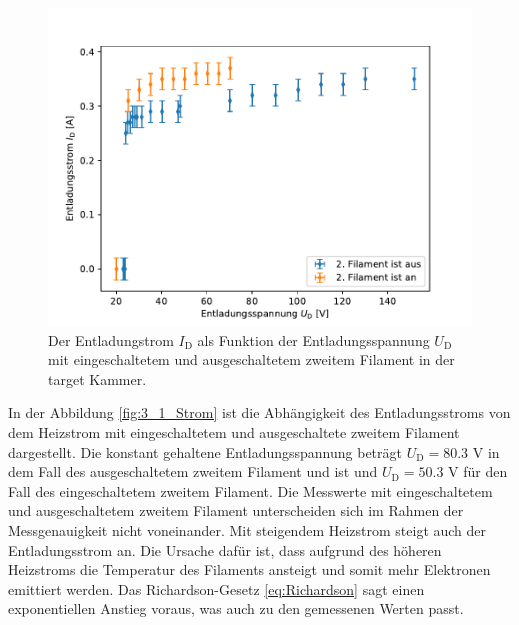 \begin{figure}[H]
\centering
\includegraphics[scale=0.6]{3_1_Spannung.pdf}
\caption{Der Entladungstrom $I_{\mathrm{D}}$ als Funktion der Entladungsspannung $U_{\mathrm{D}}$   mit eingeschaltetem und ausgeschaltetem zweitem Filament in der target Kammer.}
\label{fig:3_1_Spannung}
\end{figure}
In der Abbildung \ref{fig:3_1_Strom} ist die Abhängigkeit des Entladungsstroms von dem Heizstrom mit eingeschaltetem und ausgeschaltete zweitem Filament dargestellt. Die konstant gehaltene Entladungsspannung beträgt $U_{\mathrm{D}}=80.3$ V in dem Fall des ausgeschaltetem zweitem Filament und  ist und $U_{\mathrm{D}}=50.3$ V für den Fall des eingeschaltetem zweitem Filament. Die Messwerte mit eingeschaltetem und ausgeschaltetem zweitem Filament unterscheiden sich im Rahmen der Messgenauigkeit nicht voneinander. Mit steigendem Heizstrom steigt auch der Entladungsstrom an. Die Ursache dafür ist, dass aufgrund des höheren Heizstroms die Temperatur des Filaments ansteigt und somit mehr Elektronen emittiert werden. Das Richardson-Gesetz \eqref{eq:Richardson} sagt einen exponentiellen Anstieg voraus, was auch zu den gemessenen Werten  passt.  
